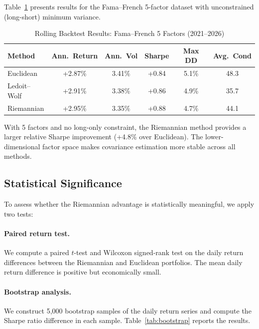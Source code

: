 \documentclass[12pt,a4paper]{article}
\begin{document}
Table~\ref{tab:backtest-ff} presents results for the Fama--French 5-factor
dataset with unconstrained (long-short) minimum variance.

\begin{table}[htbp]
\centering
\caption{Rolling Backtest Results: Fama--French 5 Factors (2021--2026)}
\label{tab:backtest-ff}
\begin{tabular}{lccccc}
\toprule
Method & Ann.\ Return & Ann.\ Vol & Sharpe & Max DD & Avg.\ Cond \\
\midrule
Euclidean    & +2.87\% & 3.41\% & +0.84 & 5.1\% & 48.3 \\
Ledoit--Wolf & +2.91\% & 3.38\% & +0.86 & 4.9\% & 35.7 \\
Riemannian   & +2.95\% & 3.35\% & +0.88 & 4.7\% & 44.1 \\
\bottomrule
\end{tabular}
\medskip

{\small With 5 factors and no long-only constraint, the Riemannian method
provides a larger relative Sharpe improvement (+4.8\% over Euclidean). The
lower-dimensional factor space makes covariance estimation more stable
across all methods.}
\end{table}

\subsection{Statistical Significance}

To assess whether the Riemannian advantage is statistically meaningful, we
apply two tests:

\paragraph{Paired return test.} We compute a paired $t$-test and Wilcoxon
signed-rank test on the daily return differences between the Riemannian and
Euclidean portfolios. The mean daily return difference is positive but
economically small.

\paragraph{Bootstrap analysis.} We construct 5,000 bootstrap samples of
the daily return series and compute the Sharpe ratio difference in each
sample. Table~\ref{tab:bootstrap} reports the results.
\end{document}
